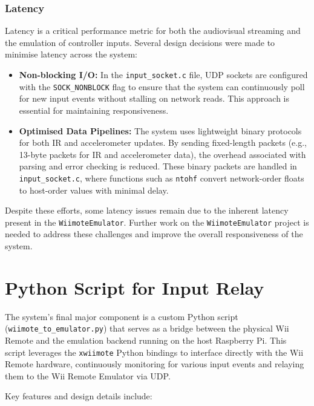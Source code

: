 \subsubsection*{Latency}

Latency is a critical performance metric for both the audiovisual streaming and the emulation of controller inputs. Several design decisions were made to minimise latency across the system:

\begin{itemize}
	\item \textbf{Non-blocking I/O:} In the \texttt{input\_socket.c} file, UDP sockets are configured with the \texttt{SOCK\_NONBLOCK} flag to ensure that the system can continuously poll for new input events without stalling on network reads. This approach is essential for maintaining responsiveness.

	\item \textbf{Optimised Data Pipelines:} The system uses lightweight binary protocols for both IR and accelerometer updates. By sending fixed-length packets (e.g., 13-byte packets for IR and accelerometer data), the overhead associated with parsing and error checking is reduced. These binary packets are handled in \texttt{input\_socket.c}, where functions such as \texttt{ntohf} convert network-order floats to host-order values with minimal delay.


\end{itemize}

Despite these efforts, some latency issues remain due to the inherent latency present in the \texttt{WiimoteEmulator}. Further work on the \texttt{WiimoteEmulator} project is needed to address these challenges and improve the overall responsiveness of the system.

\section{Python Script for Input Relay}
The system’s final major component is a custom Python script (\texttt{wiimote\_to\_emulator.py}) that serves as a bridge between the physical Wii Remote and the emulation backend running on the host Raspberry Pi. This script leverages the \texttt{xwiimote} Python bindings to interface directly with the Wii Remote hardware, continuously monitoring for various input events and relaying them to the Wii Remote Emulator via UDP.

Key features and design details include:

